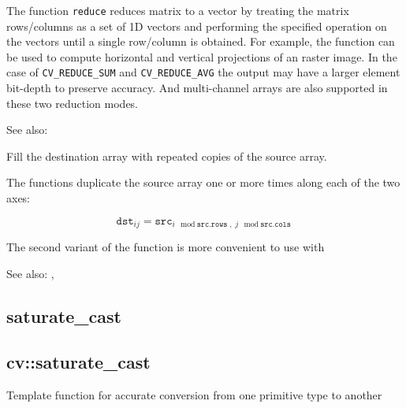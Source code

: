The function \texttt{reduce} reduces matrix to a vector by treating the matrix rows/columns as a set of 1D vectors and performing the specified operation on the vectors until a single row/column is obtained. For example, the function can be used to compute horizontal and vertical projections of an raster image. In the case of \texttt{CV\_REDUCE\_SUM} and \texttt{CV\_REDUCE\_AVG} the output may have a larger element bit-depth to preserve accuracy. And multi-channel arrays are also supported in these two reduction modes. 

See also: 

Fill the destination array with repeated copies of the source array.

\begin{description}
\end{description}

The functions  duplicate the source array one or more times along each of the two axes:

\[\texttt{dst}_{ij}=\texttt{src}_{i\mod\texttt{src.rows},\;j\mod\texttt{src.cols}}\]

The second variant of the function is more convenient to use with 

See also: , 

\ifplastex
\subsection{saturate\_cast}\label{cppfunc.saturatecast}
\else
\subsection{cv::saturate\_cast}\label{cppfunc.saturatecast}
\fi
Template function for accurate conversion from one primitive type to another


